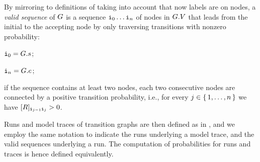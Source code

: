 By mirroring to definitions of  taking into account that now labels are on nodes, a \emph{valid sequence} of $G$ is a sequence $\textnormal{\texttt{i}}_0\ldots\textnormal{\texttt{i}}_n$ of nodes in $G.V$ that leads from the initial to the accepting node by only traversing transitions with nonzero probability:
\begin{inparaenum}[\it (i)]
\item $\textnormal{\texttt{i}}_0 = G.s$;
\item $\textnormal{\texttt{i}}_n = G.e$;
\item if the sequence contains at least two nodes, each two consecutive nodes are connected by a positive transition probability, i.e., for every $j \in \set{1,\ldots,n}$ we have $[R]_{\textnormal{\texttt{i}}_{j-1}\textnormal{\texttt{i}}_{j}} > 0$.
\end{inparaenum}
Runs and model traces of transition graphs are then defined as in , and we employ the same notation to indicate the runs underlying a model trace, and the valid sequences underlying a run. The computation of probabilities for runs and traces is hence defined equivalently.




%
%




